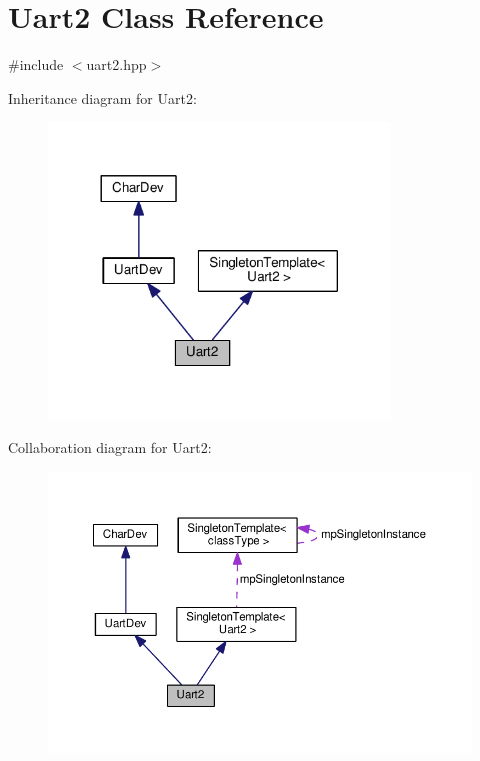 \hypertarget{classUart2}{}\section{Uart2 Class Reference}
\label{classUart2}


{\ttfamily \#include $<$uart2.\+hpp$>$}



Inheritance diagram for Uart2\+:\nopagebreak
\begin{figure}[H]
\begin{center}
\leavevmode
\includegraphics[width=257pt]{df/d92/classUart2__inherit__graph}
\end{center}
\end{figure}


Collaboration diagram for Uart2\+:\nopagebreak
\begin{figure}[H]
\begin{center}
\leavevmode
\includegraphics[width=350pt]{d7/d3d/classUart2__coll__graph}
\end{center}
\end{figure}
